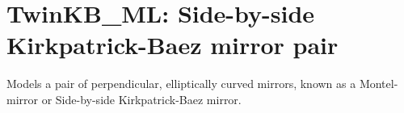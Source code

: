 \section{TwinKB\_ML: Side-by-side Kirkpatrick-Baez mirror pair}


Models a pair of perpendicular, elliptically curved mirrors, known as a Montel-mirror or Side-by-side Kirkpatrick-Baez mirror.
